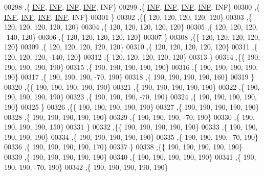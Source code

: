 \begin{DoxyCode}
00298   ,\{   \hyperlink{constants_8h_a12c2040f25d8e3a7b9e1c2024c618cb6}{INF},   \hyperlink{constants_8h_a12c2040f25d8e3a7b9e1c2024c618cb6}{INF},   \hyperlink{constants_8h_a12c2040f25d8e3a7b9e1c2024c618cb6}{INF},   \hyperlink{constants_8h_a12c2040f25d8e3a7b9e1c2024c618cb6}{INF},   INF\}
00299   ,\{   \hyperlink{constants_8h_a12c2040f25d8e3a7b9e1c2024c618cb6}{INF},   \hyperlink{constants_8h_a12c2040f25d8e3a7b9e1c2024c618cb6}{INF},   \hyperlink{constants_8h_a12c2040f25d8e3a7b9e1c2024c618cb6}{INF},   \hyperlink{constants_8h_a12c2040f25d8e3a7b9e1c2024c618cb6}{INF},   INF\}
00300   ,\{   \hyperlink{constants_8h_a12c2040f25d8e3a7b9e1c2024c618cb6}{INF},   \hyperlink{constants_8h_a12c2040f25d8e3a7b9e1c2024c618cb6}{INF},   \hyperlink{constants_8h_a12c2040f25d8e3a7b9e1c2024c618cb6}{INF},   \hyperlink{constants_8h_a12c2040f25d8e3a7b9e1c2024c618cb6}{INF},   INF\}
00301   \}
00302  ,\{\{   120,   120,   120,   120,   120\}
00303   ,\{   120,   120,   120,   120,   120\}
00304   ,\{   120,   120,   120,   120,   120\}
00305   ,\{   120,   120,   120,  -140,   120\}
00306   ,\{   120,   120,   120,   120,   120\}
00307   \}
00308  ,\{\{   120,   120,   120,   120,   120\}
00309   ,\{   120,   120,   120,   120,   120\}
00310   ,\{   120,   120,   120,   120,   120\}
00311   ,\{   120,   120,   120,  -140,   120\}
00312   ,\{   120,   120,   120,   120,   120\}
00313   \}
00314  ,\{\{   190,   190,   190,   190,   190\}
00315   ,\{   190,   190,   190,   190,   190\}
00316   ,\{   190,   190,   190,   190,   190\}
00317   ,\{   190,   190,   190,   -70,   190\}
00318   ,\{   190,   190,   190,   190,   160\}
00319   \}
00320  ,\{\{   190,   190,   190,   190,   190\}
00321   ,\{   190,   190,   190,   190,   190\}
00322   ,\{   190,   190,   190,   190,   190\}
00323   ,\{   190,   190,   190,   -70,   190\}
00324   ,\{   190,   190,   190,   190,   190\}
00325   \}
00326  ,\{\{   190,   190,   190,   190,   190\}
00327   ,\{   190,   190,   190,   190,   190\}
00328   ,\{   190,   190,   190,   190,   190\}
00329   ,\{   190,   190,   190,   -70,   190\}
00330   ,\{   190,   190,   190,   190,   150\}
00331   \}
00332  ,\{\{   190,   190,   190,   190,   190\}
00333   ,\{   190,   190,   190,   190,   190\}
00334   ,\{   190,   190,   190,   190,   190\}
00335   ,\{   190,   190,   190,   -70,   190\}
00336   ,\{   190,   190,   190,   190,   170\}
00337   \}
00338  ,\{\{   190,   190,   190,   190,   190\}
00339   ,\{   190,   190,   190,   190,   190\}
00340   ,\{   190,   190,   190,   190,   190\}
00341   ,\{   190,   190,   190,   -70,   190\}
00342   ,\{   190,   190,   190,   190,   190\}

\end{DoxyCode}
